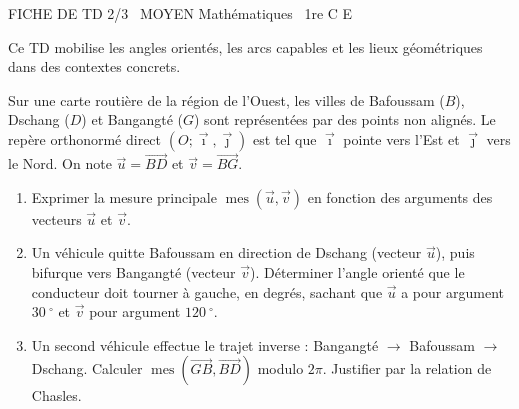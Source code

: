 \documentclass[11pt]{article}
\providecommand{\degree}{^{\circ}}
\begin{document}
\begin{tcolorbox}[enhanced,colback=popink,colframe=popink,arc=10pt,boxrule=0pt,left=12pt,right=12pt,top=9pt,bottom=9pt]
{\color{white}\popxbold\small FICHE DE TD 2/3 \textbullet\ MOYEN \hfill Mathématiques \textbullet\ 1re C E\par}
\end{tcolorbox}
\vspace{4pt}
Ce TD mobilise les angles orientés, les arcs capables et les lieux géométriques dans des contextes concrets.

\begin{exercice}
Sur une carte routière de la région de l'Ouest, les villes de Bafoussam ($B$), Dschang ($D$) et Bangangté ($G$) sont représentées par des points non alignés. Le repère orthonormé direct $(O; \vec{\imath}, \vec{\jmath})$ est tel que $\vec{\imath}$ pointe vers l'Est et $\vec{\jmath}$ vers le Nord. On note $\vec{u} = \overrightarrow{BD}$ et $\vec{v} = \overrightarrow{BG}$.
\begin{enumerate}
    \item Exprimer la mesure principale $\operatorname{mes}(\vec{u}, \vec{v})$ en fonction des arguments des vecteurs $\vec{u}$ et $\vec{v}$.
    \item Un véhicule quitte Bafoussam en direction de Dschang (vecteur $\vec{u}$), puis bifurque vers Bangangté (vecteur $\vec{v}$). Déterminer l'angle orienté que le conducteur doit tourner à gauche, en degrés, sachant que $\vec{u}$ a pour argument $\SI{30}{\degree}$ et $\vec{v}$ pour argument $\SI{120}{\degree}$.
    \item Un second véhicule effectue le trajet inverse : Bangangté $\to$ Bafoussam $\to$ Dschang. Calculer $\operatorname{mes}(\overrightarrow{GB}, \overrightarrow{BD})$ modulo $2\pi$. Justifier par la relation de Chasles.
\end{enumerate}
\end{exercice}
\end{document}
